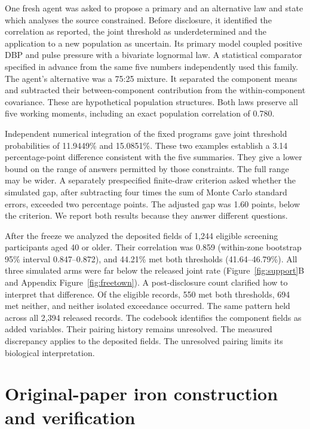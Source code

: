 One fresh agent was asked to propose a primary and an alternative law and state which analyses the source constrained. Before disclosure, it identified the correlation as reported, the joint threshold as underdetermined and the application to a new population as uncertain. Its primary model coupled positive DBP and pulse pressure with a bivariate lognormal law. A statistical comparator specified in advance from the same five numbers independently used this family. The agent's alternative was a 75:25 mixture. It separated the component means and subtracted their between-component contribution from the within-component covariance. These are hypothetical population structures. Both laws preserve all five working moments, including an exact population correlation of 0.780.

Independent numerical integration of the fixed programs gave joint threshold probabilities of 11.9449\% and 15.0851\%. These two examples establish a 3.14 percentage-point difference consistent with the five summaries. They give a lower bound on the range of answers permitted by those constraints. The full range may be wider. A separately prespecified finite-draw criterion asked whether the simulated gap, after subtracting four times the sum of Monte Carlo standard errors, exceeded two percentage points. The adjusted gap was 1.60 points, below the criterion. We report both results because they answer different questions.

After the freeze we analyzed the deposited fields of 1,244 eligible screening participants aged 40 or older. Their correlation was 0.859 (within-zone bootstrap 95\% interval 0.847--0.872), and 44.21\% met both thresholds (41.64--46.79\%). All three simulated arms were far below the released joint rate (Figure~\ref{fig:support}B and Appendix Figure~\ref{fig:freetown}). A post-disclosure count clarified how to interpret that difference. Of the eligible records, 550 met both thresholds, 694 met neither, and neither isolated exceedance occurred. The same pattern held across all 2,394 released records. The codebook identifies the component fields as added variables. Their pairing history remains unresolved. The measured discrepancy applies to the deposited fields. The unresolved pairing limits its biological interpretation.

\section{Original-paper iron construction and verification}
\label{app:ironpros}
\label{sec:ironpros}


